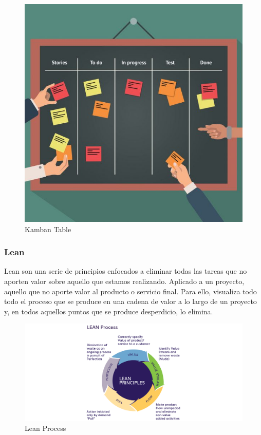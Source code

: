 \documentclass[a4paper,11pt]{book}
\begin{document}
\begin{figure}[H]  
\centering 
\includegraphics[scale=0.35]{imagenes/kamban.jpg}
\caption{ Kamban Table\cite{kanban} }  
\end{figure}

\subsubsection{Lean}
Lean son una serie de principios enfocados a eliminar todas las tareas que no aporten valor sobre aquello que estamos realizando. Aplicado a un proyecto, aquello que no aporte valor al producto o servicio final. Para ello, visualiza todo todo el proceso que se produce en una cadena de valor a lo largo de un proyecto y, en todos aquellos puntos que se produce desperdicio, lo elimina.

\begin{figure}[H]  
\centering 
\includegraphics[scale=0.35]{imagenes/lean.png}
\caption{ Lean Process\cite{lean} }  
\end{figure}
\end{document}
